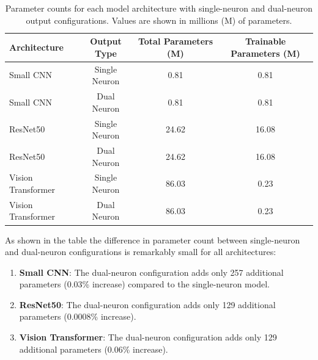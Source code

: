 \begin{table}[htbp]
\centering
\begin{tabular}{lccc}
\hline
\textbf{Architecture} & \textbf{Output Type} & \textbf{Total Parameters (M)} & \textbf{Trainable Parameters (M)} \\
\hline
Small CNN & Single Neuron & 0.81 & 0.81 \\
Small CNN & Dual Neuron & 0.81 & 0.81 \\
\hline
ResNet50 & Single Neuron & 24.62 & 16.08 \\
ResNet50 & Dual Neuron & 24.62 & 16.08 \\
\hline
Vision Transformer & Single Neuron & 86.03 & 0.23 \\
Vision Transformer & Dual Neuron & 86.03 & 0.23 \\
\hline
\end{tabular}
\caption{Parameter counts for each model architecture with single-neuron and dual-neuron output configurations. Values are shown in millions (M) of parameters.}
\label{tab:parameter_counts}
\end{table}

As shown in the table the difference in parameter count between single-neuron and dual-neuron configurations is remarkably small for all architectures:

\begin{enumerate}
\item \textbf{Small CNN}: The dual-neuron configuration adds only 257 additional parameters (0.03\% increase) compared to the single-neuron model.

\item \textbf{ResNet50}: The dual-neuron configuration adds only 129 additional parameters (0.0008\% increase).

\item \textbf{Vision Transformer}: The dual-neuron configuration adds only 129 additional parameters (0.06\% increase).
\end{enumerate}

